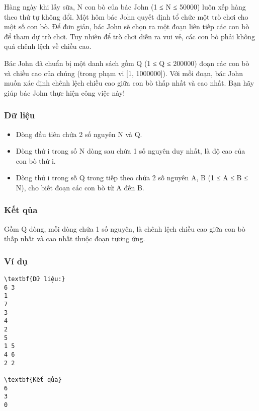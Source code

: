 



   Hàng ngày khi lấy sữa, N con bò của bác John (1 ≤ N ≤ 50000) luôn xếp hàng theo thứ tự không đổi. Một hôm bác John quyết định tổ chức một trò chơi cho một số con bò. Để đơn giản, bác John sẽ   chọn ra một đoạn liên tiếp các con bò để tham dự trò chơi. Tuy nhiên để trò chơi diễn ra vui vẻ, các con bò phải không quá chênh lệch về chiều cao.  

   Bác John đã chuẩn bị một danh sách gồm Q (1 ≤ Q ≤ 200000) đoạn các con bò và chiều cao của chúng (trong phạm vi [1, 1000000]). Với mỗi đoạn, bác John muốn xác định chênh lệch chiều cao giữa   con bò thấp nhất và cao nhất. Bạn hãy giúp bác John thực hiện công việc này!  

\subsubsection{   Dữ liệu  }
\begin{itemize}
	\item     Dòng đầu tiên chứa 2 số nguyên N và Q.   
	\item     Dòng thứ i trong số N dòng sau chứa 1 số nguyên duy nhất, là độ cao của con bò thứ i.   
	\item     Dòng thứ i trong số Q trong tiếp theo chứa 2 số nguyên A, B (1 ≤ A ≤ B ≤ N), cho biết đoạn các con bò từ A đến B.   
\end{itemize}

\subsubsection{   Kết qủa  }

   Gồm Q dòng, mỗi dòng chứa 1 số nguyên, là chênh lệch chiều cao giữa con bò thấp nhất và cao nhất thuộc đoạn tương ứng.  

\subsubsection{   Ví dụ  }
\begin{verbatim}
\textbf{Dữ liệu:}
6 3
1
7
3
4
2
5
1 5
4 6
2 2

\textbf{Kết qủa}
6
3
0
\end{verbatim}